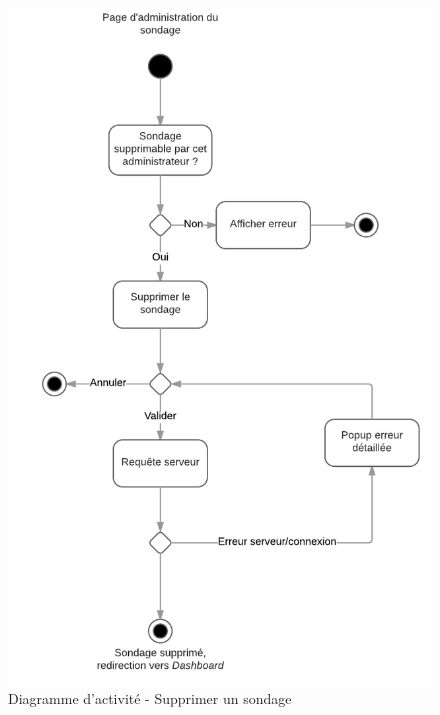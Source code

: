 \documentclass[titlepage]{report}
\begin{document}
\begin{figure}[h]
	\caption{Diagramme d'activité - Supprimer un sondage}
	\label{annexe_diagramme_activite_supprimerSondage}
	\centering
	\includegraphics[scale=0.7]{figures/diagrammes/activite_supprimerSondage.png}
\end{figure}
\end{document}
